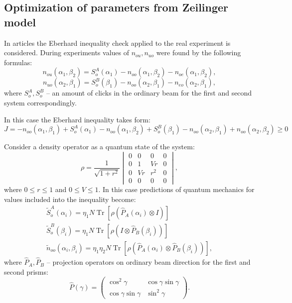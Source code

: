 \documentclass[%
master,         %
subf,           %
href,           %
colorlinks=true %
]{disser}
\DeclareMathOperator{\Tr}{Tr}
\numberwithin{equation}{section}
\numberwithin{figure}{section}
\begin{document}
\clearpage

\subsection{Optimization of parameters from Zeilinger model}
In articles \cite{Zeilinger, Zeilinger1} the Eberhard inequality check applied to the real experiment is considered. 
During experiments values of $n_{ou}, n_{uo}$  were found by the following formulas:
\[
n_{ou}(\alpha_1, \beta_2) = S_o^A(\alpha_1) - n_{oo}(\alpha_1, \beta_2) - n_{oe}(\alpha_1, \beta_2),
\]
\[
n_{uo}(\alpha_2, \beta_1) = S_o^B(\beta_1) - n_{oo}(\alpha_2, \beta_1) - n_{eo}(\alpha_2, \beta_1),
\]
where $S_o^A, S_o^B$ -- an amount of clicks in the ordinary beam for the first and second system 
correspondingly.

In this case the Eberhard inequality takes form:
\begin{equation}
J = -n_{oo}(\alpha_1, \beta_1) + S_o^A(\alpha_1) - n_{oo}(\alpha_1, \beta_2) + S_o^B(\beta_1) - n_{oo}(\alpha_2, \beta_1) + n_{oo}(\alpha_2, \beta_2) \geq 0
\label{eq:Zeilinger_J}
\end{equation}

Consider a density operator as a quantum state of the system:
\[
\rho = \frac{1}{\sqrt{1+r^2}}
\begin{vmatrix}
0 & 0 & 0 & 0\\
0 & 1 & Vr & 0\\
0 & Vr & r^2 & 0\\
0 & 0 & 0 & 0
\end{vmatrix},
\]
where $0 \leq r \leq 1$ and $0 \leq V \leq 1$.
In this case predictions of quantum mechanics for values included into the inequality become:
\begin{eqnarray*}
\tilde{S}_o^A(\alpha_i) = \eta_1 N \Tr[\rho(\hat{P}_A(\alpha_i) \otimes I)]\\
\tilde{S}_o^B(\beta_i) = \eta_1 N \Tr[\rho(I \otimes \hat{P}_B(\beta_i))]\\
\tilde{n}_{oo}(\alpha_i, \beta_i) = \eta_1\eta_2 N \Tr[\rho(\hat{P}_A(\alpha_i) \otimes \hat{P}_B(\beta_i))],
\end{eqnarray*}
where $\hat{P}_A, \hat{P}_B$ -- projection operators on ordinary beam direction for the first and second prisms:
\[
\hat{P}(\gamma) = 
\begin{pmatrix}
\cos^2\gamma & \cos\gamma\sin\gamma\\
\cos\gamma\sin\gamma & \sin^2\gamma
\end{pmatrix}.
\]
\end{document}
